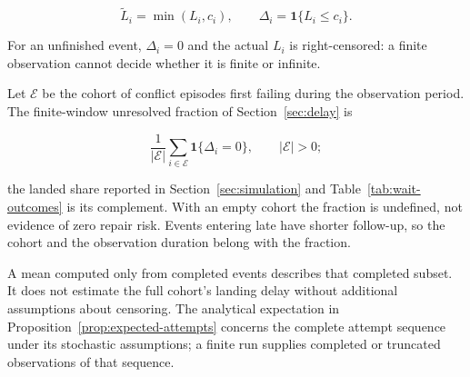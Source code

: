 \documentclass[pdflatex,sn-mathphys-ay]{sn-jnl}
\theoremstyle{thmstyleone}
\theoremstyle{thmstylethree}
\begin{document}
\begin{appendices}
\[
\widetilde L_i=\min(L_i,c_i),
\qquad
\Delta_i=\mathbf 1\{L_i\le c_i\}.
\]

For an unfinished event, \(\Delta_i=0\) and the actual \(L_i\) is right-censored: a finite observation cannot decide whether it is finite or infinite.

Let \(\mathcal E\) be the cohort of conflict episodes first failing during the observation period. The finite-window unresolved fraction of Section~\ref{sec:delay} is

\[
\frac{1}{|\mathcal E|}\sum_{i\in\mathcal E}\mathbf 1\{\Delta_i=0\},
\qquad |\mathcal E|>0;
\]

the landed share reported in Section~\ref{sec:simulation} and Table~\ref{tab:wait-outcomes} is its complement. With an empty cohort the fraction is undefined, not evidence of zero repair risk. Events entering late have shorter follow-up, so the cohort and the observation duration belong with the fraction.

A mean computed only from completed events describes that completed subset. It does not estimate the full cohort's landing delay without additional assumptions about censoring. The analytical expectation in Proposition~\ref{prop:expected-attempts} concerns the complete attempt sequence under its stochastic assumptions; a finite run supplies completed or truncated observations of that sequence.
\end{appendices}
\backmatter

\end{document}
